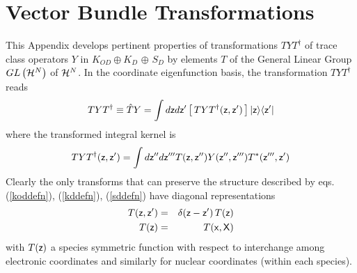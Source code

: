 \section{Vector Bundle Transformations}

\noindent This Appendix develops pertinent properties of transformations $%
TYT^{\dagger }$ of trace class operators $Y$ in $K_{OD}\oplus K_{D}$ $\oplus 
$ $S_{D}$ by elements $T$ of the General Linear Group $GL\left( {\cal H}%
^{N}\right) $ of ${\cal H}^{N}$. In the coordinate eigenfunction basis, the
transformation $TYT^{\dagger }$ reads 
\begin{equation}
TYT^{\dagger }\equiv \hat{T}Y=\int d{\sf z}d{\sf z}^{\prime }\left[
\,TYT^{\dagger }({\sf z},{\sf z}^{\prime })\,\right] |{\sf z}\rangle \langle 
{\sf z}^{\prime }|  \label{TYT}
\end{equation}%
where the transformed integral kernel is 
\begin{equation}
TYT^{\dagger }({\sf z},{\sf z}^{\prime })=\int d{\sf z}^{\prime \prime }d%
{\sf z}^{\prime \prime \prime }T({\sf z},{\sf z}^{\prime \prime })Y({\sf z}%
^{\prime \prime },{\sf z}^{\prime \prime \prime })T^{\ast }({\sf z}^{\prime
\prime \prime },{\sf z}^{\prime })  \label{TYTkernel}
\end{equation}%
Clearly the only transforms that can preserve the structure described by
eqs. (\ref{koddefn}), (\ref{kddefn}), (\ref{sddefn}) have diagonal
representations 
\begin{eqnarray}
T({\sf z},{\sf z}^{\prime }) &=&\delta ({\sf z}-{\sf z}^{\prime })\,T({\sf z}%
)  \nonumber \\
T({\sf z}) &=&T({\sf x},{\sf X})  \label{Tddefn}
\end{eqnarray}%
with $T({\sf z})$ a species symmetric function with respect to interchange
among electronic coordinates and similarly for nuclear coordinates (within
each species).

